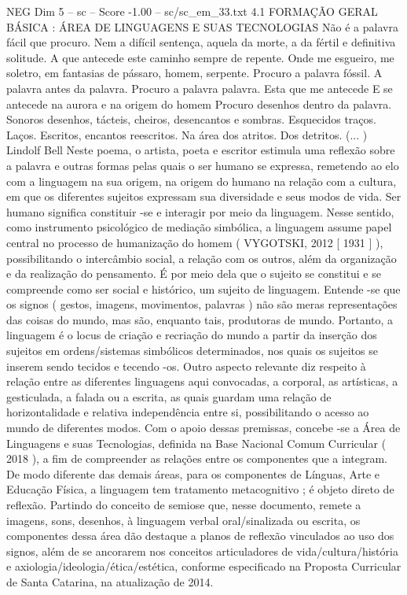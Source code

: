 \begin{textsample}{NEG Dim 5 – sc – Score -1.00 – sc/sc\_em\_33.txt}  \label{ex:f5_neg_253}
4.1 FORMAÇÃO GERAL BÁSICA : ÁREA DE LINGUAGENS E SUAS TECNOLOGIAS Não é a palavra fácil que procuro.
Nem a difícil sentença, aquela da morte, a da fértil e definitiva solitude.
A que antecede este caminho sempre de repente.
Onde me esgueiro, me soletro, em fantasias de pássaro, homem, serpente.
Procuro a palavra fóssil.
A palavra antes da palavra.
Procuro a palavra palavra.
Esta que me antecede E se antecede na aurora e na origem do homem Procuro desenhos dentro da palavra.
Sonoros desenhos, tácteis, cheiros, desencantos e sombras.
Esquecidos traços.
Laços.
Escritos, encantos reescritos.
Na área dos atritos.
Dos detritos. (... ) Lindolf Bell Neste poema, o artista, poeta e escritor estimula uma reflexão sobre a palavra e outras formas pelas quais o ser humano se expressa, remetendo ao elo com a linguagem na sua origem, na origem do humano na relação com a cultura, em que os diferentes sujeitos expressam sua diversidade e seus modos de vida.
Ser humano significa constituir -se e interagir por meio da linguagem.
Nesse sentido, como instrumento psicológico de mediação simbólica, a linguagem assume papel central no processo de humanização do homem ( VYGOTSKI, 2012 [ 1931 ] ), possibilitando o intercâmbio social, a relação com os outros, além da organização e da realização do pensamento.
É por meio dela que o sujeito se constitui e se compreende como ser social e histórico, um sujeito de linguagem.
Entende -se que os signos ( gestos, imagens, movimentos, palavras ) não são meras representações das coisas do mundo, mas são, enquanto tais, produtoras de mundo.
Portanto, a linguagem é o locus de criação e recriação do mundo a partir da inserção dos sujeitos em ordens/sistemas simbólicos determinados, nos quais os sujeitos se inserem sendo tecidos e tecendo -os.
Outro aspecto relevante diz respeito à relação entre as diferentes linguagens aqui convocadas, a corporal, as artísticas, a gesticulada, a falada ou a escrita, as quais guardam uma relação de horizontalidade e relativa independência entre si, possibilitando o acesso ao mundo de diferentes modos.
Com o apoio dessas premissas, concebe -se a Área de Linguagens e suas Tecnologias, definida na Base Nacional Comum Curricular ( 2018 ), a fim de compreender as relações entre os componentes que a integram.
De modo diferente das demais áreas, para os componentes de Línguas, Arte e Educação Física, a linguagem tem tratamento metacognitivo ; é objeto direto de reflexão.
Partindo do conceito de semiose que, nesse documento, remete a imagens, sons, desenhos, à linguagem verbal oral/sinalizada ou escrita, os componentes dessa área dão destaque a planos de reflexão vinculados ao uso dos signos, além de se ancorarem nos conceitos articuladores de vida/cultura/história e axiologia/ideologia/ética/estética, conforme especificado na Proposta Curricular de Santa Catarina, na atualização de 2014.

\end{textsample}
